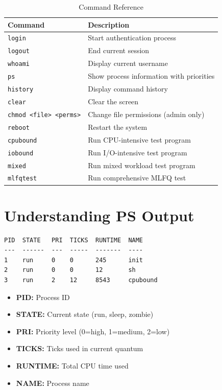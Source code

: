\documentclass[a4paper,12pt]{report}
\begin{document}
\begin{table}[H]
\centering
\begin{tabular}{|l|p{9cm}|}
\hline
\textbf{Command} & \textbf{Description} \\
\hline
\texttt{login} & Start authentication process \\
\texttt{logout} & End current session \\
\texttt{whoami} & Display current username \\
\texttt{ps} & Show process information with priorities \\
\texttt{history} & Display command history \\
\texttt{clear} & Clear the screen \\
\texttt{chmod <file> <perms>} & Change file permissions (admin only) \\
\texttt{reboot} & Restart the system \\
\texttt{cpubound} & Run CPU-intensive test program \\
\texttt{iobound} & Run I/O-intensive test program \\
\texttt{mixed} & Run mixed workload test program \\
\texttt{mlfqtest} & Run comprehensive MLFQ test \\
\hline
\end{tabular}
\caption{Command Reference}
\label{tab:commands}
\end{table}

\section{Understanding PS Output}

\begin{lstlisting}[caption=PS Command Output Format]
PID  STATE   PRI  TICKS  RUNTIME  NAME
---  ------  ---  -----  -------  ----
1    run     0    0      245      init
2    run     0    0      12       sh
3    run     2    12     8543     cpubound
\end{lstlisting}

\begin{itemize}
    \item \textbf{PID:} Process ID
    \item \textbf{STATE:} Current state (run, sleep, zombie)
    \item \textbf{PRI:} Priority level (0=high, 1=medium, 2=low)
    \item \textbf{TICKS:} Ticks used in current quantum
    \item \textbf{RUNTIME:} Total CPU time used
    \item \textbf{NAME:} Process name
\end{itemize}
\end{document}
